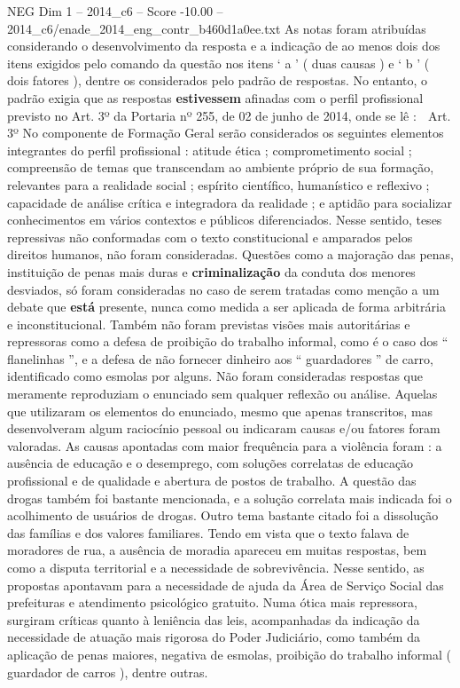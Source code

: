 \begin{textsample}{NEG Dim 1 – 2014\_c6 – Score -10.00 – 2014\_c6/enade\_2014\_eng\_contr\_b460d1a0ee.txt}
As notas foram atribuídas considerando o desenvolvimento da resposta e a indicação de ao menos dois dos itens exigidos pelo comando da questão nos itens ‘ a ’ ( duas causas ) e ‘ b ’ ( dois fatores ), dentre os considerados pelo padrão de respostas.
No entanto, o padrão exigia que as respostas \textbf{estivessem} afinadas com o perfil profissional previsto no Art. 3º da Portaria nº 255, de 02 de junho de 2014, onde se lê :  Art. 3º No componente de Formação Geral serão considerados os seguintes elementos integrantes do perfil profissional : atitude ética ; comprometimento social ; compreensão de temas que transcendam ao ambiente próprio de sua formação, relevantes para a realidade social ; espírito científico, humanístico e reflexivo ; capacidade de análise crítica e integradora da realidade ; e aptidão para socializar conhecimentos em vários contextos e públicos diferenciados.
Nesse sentido, teses repressivas não conformadas com o texto constitucional e amparados pelos direitos humanos, não foram consideradas.
Questões como a majoração das penas, instituição de penas mais duras e \textbf{criminalização} da conduta dos menores desviados, só foram consideradas no caso de serem tratadas como menção a um debate que \textbf{está} presente, nunca como medida a ser aplicada de forma arbitrária e inconstitucional.
Também não foram previstas visões mais autoritárias e repressoras como a defesa de proibição do trabalho informal, como é o caso dos “ flanelinhas ”, e a defesa de não fornecer dinheiro aos “ guardadores ” de carro, identificado como esmolas por alguns.
Não foram consideradas respostas que meramente reproduziam o enunciado sem qualquer reflexão ou análise.
Aquelas que utilizaram os elementos do enunciado, mesmo que apenas transcritos, mas desenvolveram algum raciocínio pessoal ou indicaram causas e/ou fatores foram valoradas.
As causas apontadas com maior frequência para a violência foram : a ausência de educação e o desemprego, com soluções correlatas de educação profissional e de qualidade e abertura de postos de trabalho.
A questão das drogas também foi bastante mencionada, e a solução correlata mais indicada foi o acolhimento de usuários de drogas.
Outro tema bastante citado foi a dissolução das famílias e dos valores familiares.
Tendo em vista que o texto falava de moradores de rua, a ausência de moradia apareceu em muitas respostas, bem como a disputa territorial e a necessidade de sobrevivência.
Nesse sentido, as propostas apontavam para a necessidade de ajuda da Área de Serviço Social das prefeituras e atendimento psicológico gratuito.
Numa ótica mais repressora, surgiram críticas quanto à leniência das leis, acompanhadas da indicação da necessidade de atuação mais rigorosa do Poder Judiciário, como também da aplicação de penas maiores, negativa de esmolas, proibição do trabalho informal ( guardador de carros ), dentre outras.

\end{textsample}
